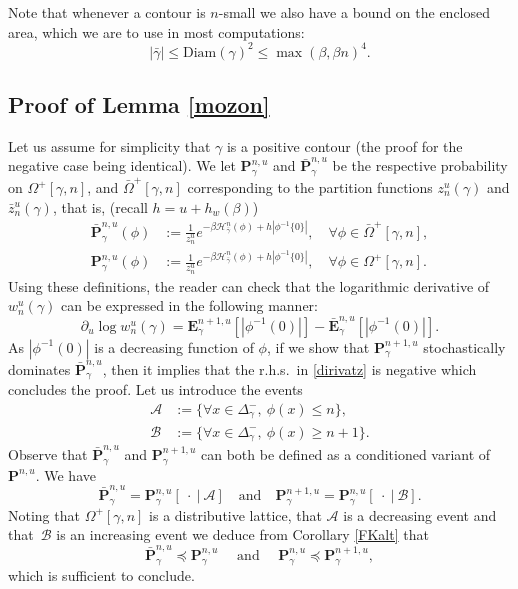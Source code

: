\documentclass[10pt]{amsart}
\let\mathcal\mathscr
\numberwithin{equation}{section}
\theoremstyle{plain}
\theoremstyle{definition}
\newcommand{\Diam}{\mathrm{Diam}}
\newcommand{\cA}{{\ensuremath{\mathcal A}} }
\newcommand{\cB}{{\ensuremath{\mathcal B}} }
\newcommand{\cH}{{\ensuremath{\mathcal H}} }
\newcommand{\bP}{{\ensuremath{\mathbf P}} }
\newcommand{\bE}{{\ensuremath{\mathbf E}} }
\newcommand{\gb}{\beta}
\newcommand{\gO}{\Omega}
\newcommand{\ldom}{\preccurlyeq}
\begin{document}
Note that whenever a contour is $n$-small we also have a bound on the enclosed area, which we are to use in most computations:
\begin{equation}\label{areabound}
|\bar \gamma| \le \Diam(\gamma)^2\le \max(\gb,\gb n)^4.
\end{equation}

\subsection{Proof of Lemma \ref{mozon}}\label{mooz}
Let us assume for simplicity that $\gamma$ is a positive contour (the proof for the negative case being identical).
We let $\bP^{n,u}_{\gamma}$ and $\bar \bP^{n,u}_{\gamma}$ be the respective probability on $\gO^+[\gamma,n]$, and $\bar \gO^+[\gamma,n]$ corresponding to the partition functions
$z^u_n(\gamma)$ and $\bar z^u_n(\gamma)$, that is, (recall $h=u+h_w(\gb)$)
\begin{equation}\label{defpnu}
\begin{split}
\bar \bP^{n,u}_{\gamma}(\phi)&:=\frac{1}{z^u_n} e^{-\gb \cH^n_{\bar \gamma}(\phi)+h |\phi^{-1}\{0\}|}, \quad \forall \phi \in \bar \gO^+[\gamma,n],\\
\bP^{n,u}_{\gamma}(\phi)&:=\frac{1}{z^u_n} e^{-\gb \cH^n_{\bar \gamma}(\phi)+h |\phi^{-1}\{0\}|}, \quad \forall \phi \in \gO^+[\gamma,n].
\end{split}
\end{equation}
Using these definitions, the reader can check that the logarithmic derivative of $w^u_n(\gamma)$ can be expressed in the following manner:
\begin{equation}\label{dirivatz}
\partial_u \log w^u_n(\gamma)= \bE^{n+1,u}_{\gamma} [ |\phi^{-1}(0)|]- \bar \bE^{n,u}_{\gamma} [|\phi^{-1}(0)|].
\end{equation}
As $|\phi^{-1}(0)|$ is a decreasing function of $\phi$,
if we show that $\bP^{n+1,u}_{\gamma}$ stochastically dominates $\bar \bP^{n,u}_{\gamma}$, then it implies that the r.h.s.\ in
\eqref{dirivatz} is negative which concludes the proof.
Let us introduce the events
\begin{equation*}
\begin{split}
\cA&:= \{ \forall x\in \Delta^-_{\gamma},\ \phi(x)\le n\},\\
\cB&:= \{ \forall x\in \Delta^-_{\gamma}, \ \phi(x)\ge n+1\}.
\end{split}
\end{equation*}
Observe that $\bar \bP^{n,u}_{\gamma}$ and $\bP^{n+1,u}_{\gamma}$ can both be defined as a conditioned variant of $\bP^{n,u}$. We have
\begin{equation*}
\bar \bP^{n,u}_{\gamma}=\bP^{n,u}_{\gamma}[ \ \cdot \ | \ \cA ] \quad\text{and}\quad \bP^{n+1,u}_{\gamma}=\bP^{n,u}_{\gamma}[ \ \cdot \ | \ \cB ].
\end{equation*}
Noting that $\gO^+[\gamma,n]$ is a distributive lattice, that $\cA$ is a decreasing event and that~$\cB$ is an increasing event we deduce from Corollary \ref{FKalt} that
\begin{equation*}
\bar \bP^{n,u}_{\gamma} \ldom \bP^{n,u}_{\gamma}\quad \text{ and } \quad \bP^{n,u}_{\gamma}\ldom \bP^{n+1,u}_{\gamma},
\end{equation*}
which is sufficient to conclude.
\end{document}
